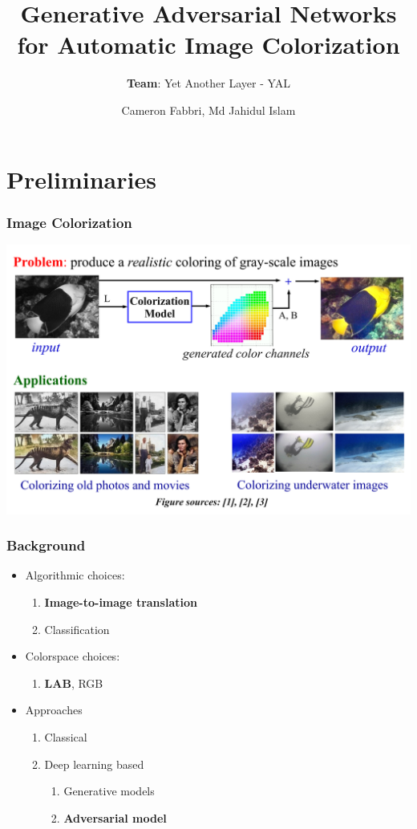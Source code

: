 \documentclass{beamer}
\title{Generative Adversarial Networks for Automatic Image Colorization}
\subtitle{\textbf{Team}: Yet Another Layer - YAL}
\author{Cameron Fabbri, Md Jahidul Islam}
\begin{document}
\date{}
\begin{frame}
\thispagestyle{empty}
\titlepage
\end{frame}

\section*{Preliminaries}
\begin{frame}
\frametitle{\textbf{Image Colorization}}

\includegraphics[width=\linewidth]{6.pdf}



\end{frame}

\begin{frame}
\frametitle{\textbf{Background}}
\begin{itemize}
  \item Algorithmic choices:
	\begin{enumerate}[$-$]
	\item  \textbf{Image-to-image translation} 
	\item Classification
	\end{enumerate}
	
	\item Colorspace choices:
  
	\begin{enumerate}[$-$]
	\item  \textbf{LAB}, RGB
	\end{enumerate}
	
	\item Approaches
  
	\begin{enumerate}[$-$]
	\item Classical
	\item Deep learning based
	\begin{enumerate}[$-$]
	  \item Generative models
	  \item \textbf{Adversarial model}
	\end{enumerate}	 
	\end{enumerate}
	
\end{itemize}
\end{frame}
\end{document}

